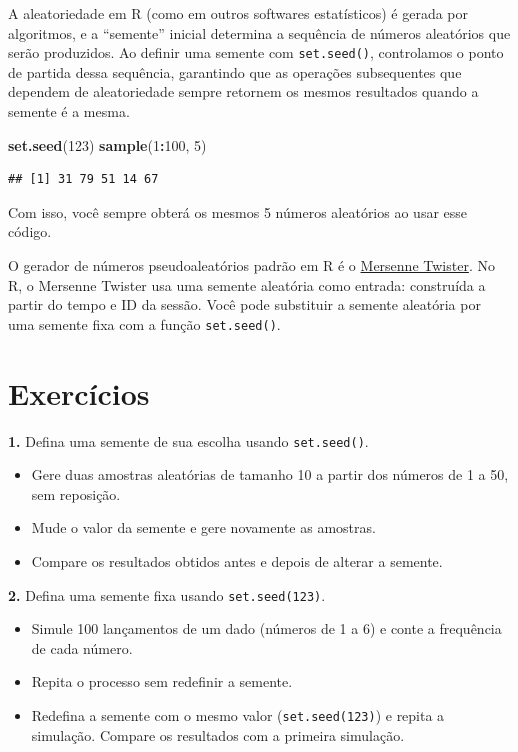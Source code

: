 \documentclass[
]{book}
\newenvironment{Shaded}{\begin{snugshade}}{\end{snugshade}}
\newcommand{\DecValTok}[1]{\textcolor[rgb]{0.00,0.00,0.81}{#1}}
\newcommand{\FunctionTok}[1]{\textcolor[rgb]{0.13,0.29,0.53}{\textbf{#1}}}
\newcommand{\NormalTok}[1]{#1}
\newcommand{\SpecialCharTok}[1]{\textcolor[rgb]{0.81,0.36,0.00}{\textbf{#1}}}
\providecommand{\tightlist}{%
  \setlength{\itemsep}{0pt}\setlength{\parskip}{0pt}}
\begin{document}
A aleatoriedade em R (como em outros softwares estatísticos) é gerada por algoritmos, e a ``semente'' inicial determina a sequência de números aleatórios que serão produzidos. Ao definir uma semente com \texttt{set.seed()}, controlamos o ponto de partida dessa sequência, garantindo que as operações subsequentes que dependem de aleatoriedade sempre retornem os mesmos resultados quando a semente é a mesma.

\begin{Shaded}
\begin{Highlighting}[]
\FunctionTok{set.seed}\NormalTok{(}\DecValTok{123}\NormalTok{)}
\FunctionTok{sample}\NormalTok{(}\DecValTok{1}\SpecialCharTok{:}\DecValTok{100}\NormalTok{, }\DecValTok{5}\NormalTok{)}
\end{Highlighting}
\end{Shaded}

\begin{verbatim}
## [1] 31 79 51 14 67
\end{verbatim}

Com isso, você sempre obterá os mesmos 5 números aleatórios ao usar esse
código.

O gerador de números pseudoaleatórios padrão em R é o \href{https://www.sciencedirect.com/science/article/abs/pii/B9780128093627500108}{Mersenne Twister}. No R, o Mersenne Twister usa uma semente aleatória como entrada: construída a partir do tempo e ID da sessão. Você pode substituir a semente aleatória por uma semente fixa com a função \texttt{set.seed()}.

\section{Exercícios}\label{exercuxedcios-23}

\textbf{1.} Defina uma semente de sua escolha usando \texttt{set.seed()}.

\begin{itemize}
\tightlist
\item
  Gere duas amostras aleatórias de tamanho 10 a partir dos números de 1 a 50, sem reposição.
\item
  Mude o valor da semente e gere novamente as amostras.
\item
  Compare os resultados obtidos antes e depois de alterar a semente.
\end{itemize}

\textbf{2.} Defina uma semente fixa usando \texttt{set.seed(123)}.

\begin{itemize}
\tightlist
\item
  Simule 100 lançamentos de um dado (números de 1 a 6) e conte a frequência de cada número.
\item
  Repita o processo sem redefinir a semente.
\item
  Redefina a semente com o mesmo valor (\texttt{set.seed(123)}) e repita a simulação. Compare os resultados com a primeira simulação.
\end{itemize}
\end{document}
